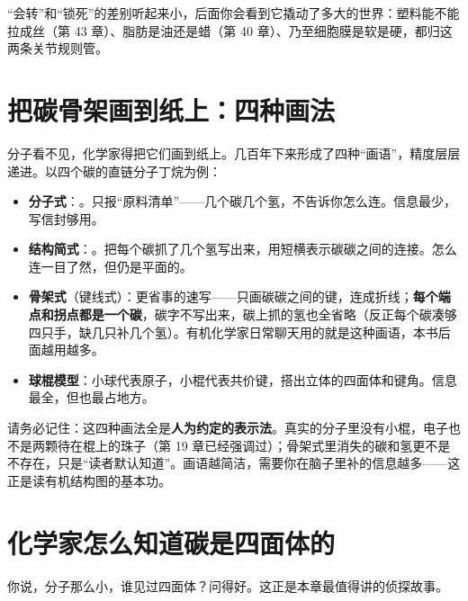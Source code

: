 “会转”和“锁死”的差别听起来小，后面你会看到它撬动了多大的世界：塑料能不能拉成丝（第 43 章）、脂肪是油还是蜡（第 40 章）、乃至细胞膜是软是硬，都归这两条关节规则管。

\section{把碳骨架画到纸上：四种画法}

分子看不见，化学家得把它们画到纸上。几百年下来形成了四种“画语”，精度层层递进。以四个碳的直链分子丁烷为例：

\begin{itemize}[itemsep=2pt]
\item \textbf{分子式}：。只报“原料清单”——几个碳几个氢，不告诉你怎么连。信息最少，写信封够用。
\item \textbf{结构简式}：。把每个碳抓了几个氢写出来，用短横表示碳碳之间的连接。怎么连一目了然，但仍是平面的。
\item \textbf{骨架式}（键线式）：更省事的速写——只画碳碳之间的键，连成折线；\textbf{每个端点和拐点都是一个碳}，碳字不写出来，碳上抓的氢也全省略（反正每个碳凑够四只手，缺几只补几个氢）。有机化学家日常聊天用的就是这种画语，本书后面越用越多。
\item \textbf{球棍模型}：小球代表原子，小棍代表共价键，搭出立体的四面体和键角。信息最全，但也最占地方。
\end{itemize}


请务必记住：这四种画法全是\textbf{人为约定的表示法}。真实的分子里没有小棍，电子也不是两颗待在棍上的珠子（第 19 章已经强调过）；骨架式里消失的碳和氢更不是不存在，只是“读者默认知道”。画语越简洁，需要你在脑子里补的信息越多——这正是读有机结构图的基本功。

\section{化学家怎么知道碳是四面体的}

你说，分子那么小，谁见过四面体？问得好。这正是本章最值得讲的侦探故事。

